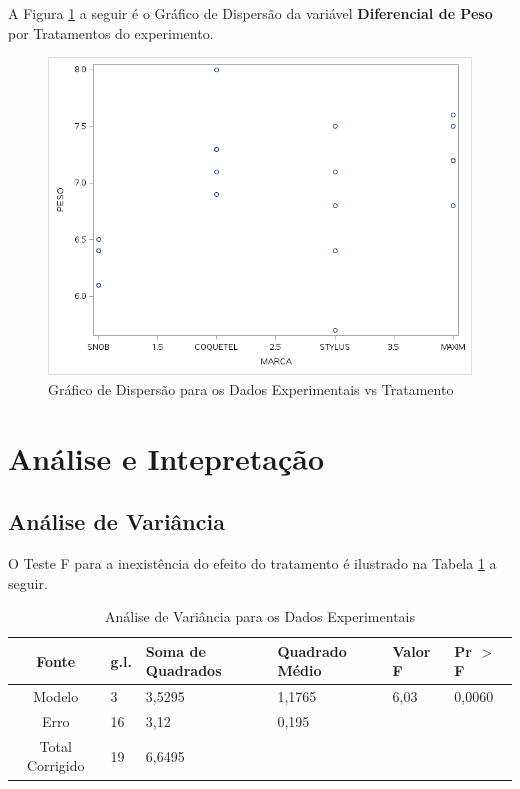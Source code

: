 \documentclass[a4paper,12pt,notitlepage]{article}
\begin{document}
A Figura \ref{grafico:sp} a seguir é o Gráfico de Dispersão da variável \textbf{Diferencial de Peso} por Tratamentos do experimento.
\begin{figure}[!htb]
    \centering
    \includegraphics[scale=0.8]{scatterplot1}
    \caption{Gráfico de Dispersão para os Dados Experimentais vs Tratamento}
    \label{grafico:sp}
\end{figure}

\section{Análise e Intepretação}
\subsection{Análise de Variância}
    O Teste F para a inexistência do efeito do tratamento é ilustrado na Tabela \ref{tabela:anova} a seguir.

\begin{table}[htb]\label{tabela:anova}
\centering
    \begin{tabular}{c||p{17mm}|p{17mm}|p{17mm}|p{17mm}|p{17mm}}
         Fonte&g.l.&Soma de Quadrados&Quadrado Médio&Valor F&Pr $>$ F  \\\hline\hline
         Modelo& 3 & 3,5295&1,1765&6,03&0,0060 \\
         Erro& 16 & 3,12 &0,195\\\cline{1-3}
         Total Corrigido & 19 & 6,6495\\
    \end{tabular}
    \caption{Análise de Variância para os Dados Experimentais}
\end{table}
\end{document}
